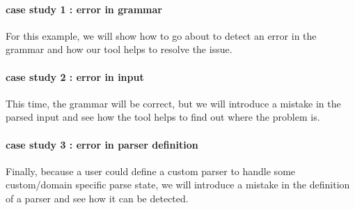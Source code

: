 	\paragraph{case study 1 : error in grammar}

	For this example, we will show how to go about to detect an error in the grammar and how our tool helps to resolve the issue.


	\paragraph{case study 2 : error in input}

	This time, the grammar will be correct, but we will introduce a mistake in the parsed input and see how the tool helps to find out where the problem is.

	\paragraph{case study 3 : error in parser definition}

	Finally, because a user could define a custom parser to handle some custom/domain specific parse state, we will introduce a mistake in the definition of a parser and see how it can be detected.